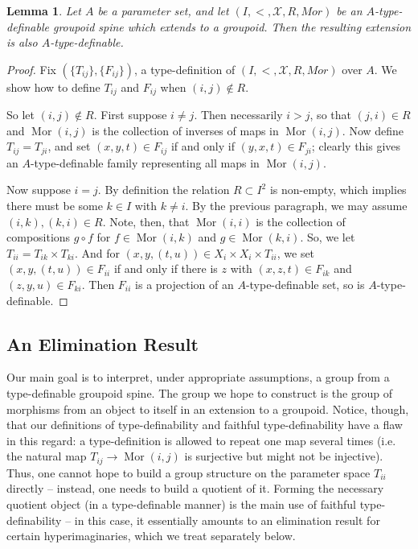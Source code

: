 \documentclass{amsart}
\newtheorem{lemma}[theorem]{Lemma}
\theoremstyle{definition}
\begin{document}
\begin{lemma}\label{L: extension definable} Let $A$ be a parameter set, and let $(I,<,\mathcal X,R,Mor)$ be an $A$-type-definable groupoid spine which extends to a groupoid. Then the resulting extension is also $A$-type-definable.
\end{lemma}
\begin{proof} Fix $(\{T_{ij}\},\{F_{ij}\})$, a type-definition of $(I,<,\mathcal X,R,Mor)$ over $A$. We show how to define $T_{ij}$ and $F_{ij}$ when $(i,j)\notin R$.

So let $(i,j)\notin R$. First suppose $i\neq j
$. Then necessarily $i>j$, so that $(j,i)\in R$ and $\operatorname{Mor}(i,j)$ is the collection of inverses of maps in $\operatorname{Mor}(i,j)$. Now define $T_{ij}=T_{ji}$, and set $(x,y,t)\in F_{ij}$ if and only if $(y,x,t)\in F_{ji}$; clearly this gives an $A$-type-definable family representing all maps in $\operatorname{Mor}(i,j).$

Now suppose $i=j$. By definition the relation $R\subset I^2$ is non-empty, which implies there must be some $k\in I$ with $k\neq i$. By the previous paragraph, we may assume $(i,k),(k,i)\in R$. Note, then, that $\operatorname{Mor}(i,i)$ is the collection of compositions $g\circ f$ for $f\in\operatorname{Mor}(i,k)$ and $g\in\operatorname{Mor}(k,i)$. So, we let $T_{ii}=T_{ik}\times T_{ki}$. And for $(x,y,(t,u))\in X_i\times X_i\times T_{ii}$, we set $(x,y,(t,u))\in F_{ii}$ if and only if there is $z$ with $(x,z,t)\in F_{ik}$ and $(z,y,u)\in F_{ki}$. Then $F_{ii}$ is a projection of an $A$-type-definable set, so is $A$-type-definable. 
\end{proof}

\subsection{An Elimination Result}

Our main goal is to interpret, under appropriate assumptions,  a group from a type-definable groupoid spine. The group we hope to construct is the group of morphisms from an object to itself in an extension to a groupoid. Notice, though, that our definitions of type-definability and faithful type-definability have a flaw in this regard: a type-definition is allowed to repeat one map several times (i.e. the natural map $T_{ij}\rightarrow\operatorname{Mor}(i,j)$ is surjective but might not be injective). Thus, one cannot hope to build a group structure on the parameter space $T_{ii}$ directly -- instead, one needs to build a quotient of it. Forming the necessary quotient object (in a type-definable manner) is the main use of faithful type-definability -- in this case, it essentially amounts to an elimination result for certain hyperimaginaries, which we treat separately below.
\end{document}
